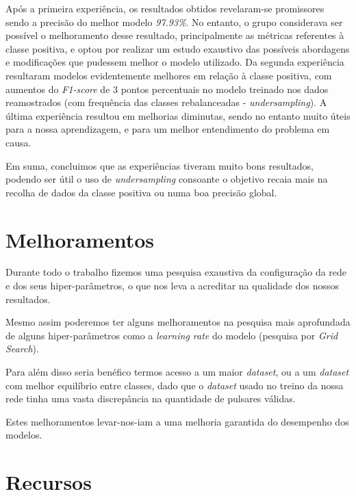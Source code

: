 \documentclass[]{article}
\begin{document}
	Após a primeira experiência, os resultados obtidos revelaram-se promissores sendo a precisão do melhor modelo \textit{97.93\%}. No entanto, o grupo considerava ser possível o melhoramento desse resultado, principalmente as métricas referentes à classe positiva, e optou por realizar um estudo exaustivo das possíveis abordagens e modificações que pudessem melhor o modelo utilizado. Da segunda experiência resultaram modelos evidentemente melhores em relação à classe positiva, com aumentos do \textit{F1-score} de 3 pontos percentuais no modelo treinado nos dados reamostrados (com frequência das classes rebalanceadas - \textit{undersampling}). A última experiência resultou em melhorias diminutas, sendo no entanto muito úteis para a nossa aprendizagem, e para um melhor entendimento do problema em causa.
	
	Em suma, concluimos que as experiências tiveram muito bons resultados, podendo ser útil o uso de \textit{undersampling} consoante o objetivo recaia mais na recolha de dados da classe positiva ou numa boa precisão global.

\section{Melhoramentos}
\label{sec:melhoramentos}
	Durante todo o trabalho fizemos uma pesquisa exaustiva da configuração da rede e dos seus hiper-parâmetros, o que nos leva a acreditar na qualidade dos nossos resultados.
    
    Mesmo assim poderemos ter alguns melhoramentos na pesquisa mais aprofundada de alguns hiper-parâmetros como a \textit{learning rate} do modelo (pesquisa por \textit{Grid Search}).
    
    Para além disso seria benéfico termos acesso a um maior \textit{dataset}, ou a um \textit{dataset} com melhor equilíbrio entre classes, dado que o \textit{dataset} usado no treino da nossa rede tinha uma vasta discrepância na quantidade de pulsares válidas.
    
    Estes melhoramentos levar-nos-iam a uma melhoria garantida do desempenho dos modelos.
    
\newpage


\section{Recursos}
\end{document}
